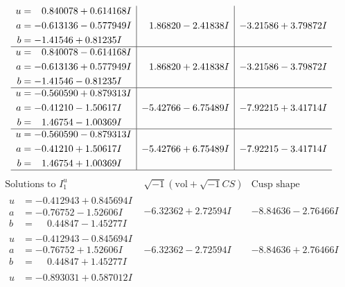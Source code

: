 \documentclass[1p]{elsarticle_modified}
\theoremstyle{definition}
\newcommand{\I}{\sqrt{-1}}
\begin{document}
$$\begin{array}{c|c|c}
\begin{aligned}
u &= \phantom{-}0.840078 + 0.614168 I \\
a &= -0.613136 - 0.577949 I \\
b &= -1.41546 + 0.81235 I\end{aligned}
 & \phantom{-}1.86820 - 2.41838 I & -3.21586 + 3.79872 I \\ \hline\begin{aligned}
u &= \phantom{-}0.840078 - 0.614168 I \\
a &= -0.613136 + 0.577949 I \\
b &= -1.41546 - 0.81235 I\end{aligned}
 & \phantom{-}1.86820 + 2.41838 I & -3.21586 - 3.79872 I \\ \hline\begin{aligned}
u &= -0.560590 + 0.879313 I \\
a &= -0.41210 - 1.50617 I \\
b &= \phantom{-}1.46754 - 1.00369 I\end{aligned}
 & -5.42766 - 6.75489 I & -7.92215 + 3.41714 I \\ \hline\begin{aligned}
u &= -0.560590 - 0.879313 I \\
a &= -0.41210 + 1.50617 I \\
b &= \phantom{-}1.46754 + 1.00369 I\end{aligned}
 & -5.42766 + 6.75489 I & -7.92215 - 3.41714 I\\
 \hline 
 \end{array}$$\newpage$$\begin{array}{c|c|c}  
\text{Solutions to }I^u_{1}& \I (\text{vol} + \sqrt{-1}CS) & \text{Cusp shape}\\
 \hline 
\begin{aligned}
u &= -0.412943 + 0.845694 I \\
a &= -0.76752 - 1.52606 I \\
b &= \phantom{-}0.44847 - 1.45277 I\end{aligned}
 & -6.32362 + 2.72594 I & -8.84636 - 2.76466 I \\ \hline\begin{aligned}
u &= -0.412943 - 0.845694 I \\
a &= -0.76752 + 1.52606 I \\
b &= \phantom{-}0.44847 + 1.45277 I\end{aligned}
 & -6.32362 - 2.72594 I & -8.84636 + 2.76466 I \\ \hline\begin{aligned}
u &= -0.893031 + 0.587012 I \\

\end{aligned}
\end{array}$$
\end{document}
